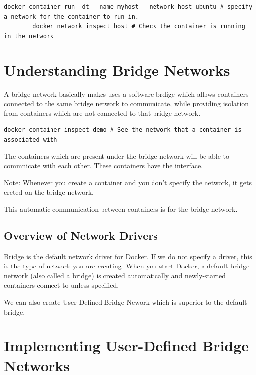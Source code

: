 \documentclass[11pt]{book}
\begin{document}

    \begin{lstlisting}[style=terminal]
        docker container run -dt --name myhost --network host ubuntu # specify a network for the container to run in.
        docker network inspect host # Check the container is running in the network
    \end{lstlisting}

    \section{Understanding Bridge Networks}
    A bridge network basically makes uses a software brdige which allows containers connected to the same bridge network to communicate,
    while providing isolation from containers which are not connected to that bridge network.


    \begin{lstlisting}[style=terminal]
        docker container inspect demo # See the network that a container is associated with
    \end{lstlisting}

    The containers which are present under the bridge network will be able to commnicate with each other.
    These containers have the interface.

    Note:
    Whenever you create a container and you don't specify the network, it gets creted on the bridge network.

    This automatic communication between containers is for the bridge network.\

    \subsection{Overview of Network Drivers}
    Bridge is the default network driver for Docker.
    If we do not specify a driver, this is the type of network you are creating.
    When you start Docker, a default bridge network (also called a bridge) is created automatically and newly-started containers connect to unless specified.

    We can also create User-Defined Bridge Nework which is superior to the default bridge.

    \section{Implementing User-Defined Bridge Networks}
\end{document}
